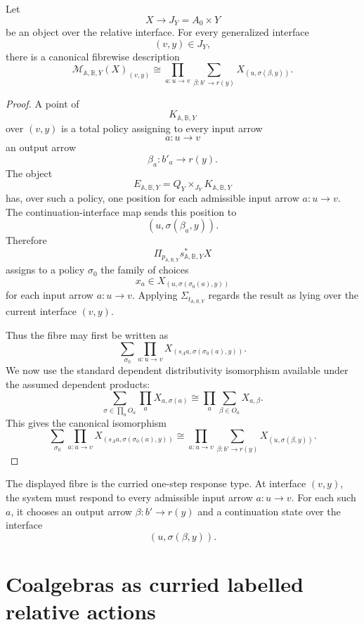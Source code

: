 \begin{proposition}
\label{prop:poly-relative-fibre-calculation}
Let
\[
X\to J_Y=A_0\times Y
\]
be an object over the relative interface.  For every generalized interface
\[
(v,y)\in J_Y,
\]
there is a canonical fibrewise description
\[
\mathcal M_{\mathbb A,\mathbb B,Y}(X)_{(v,y)}
\cong
\prod_{a:u\to v}
\sum_{\beta:b'\to r(y)}
X_{(u,\sigma(\beta,y))}.
\]
\end{proposition}

\begin{proof}
A point of
\[
K_{\mathbb A,\mathbb B,Y}
\]
over \((v,y)\) is a total policy assigning to every input arrow
\[
a:u\to v
\]
an output arrow
\[
\beta_a:b'_a\to r(y).
\]
The object
\[
E_{\mathbb A,\mathbb B,Y}
=
Q_Y\times_{J_Y}K_{\mathbb A,\mathbb B,Y}
\]
has, over such a policy, one position for each admissible input arrow
\(a:u\to v\).  The continuation-interface map sends this position to
\[
(u,\sigma(\beta_a,y)).
\]
Therefore
\[
\Pi_{p_{\mathbb A,\mathbb B,Y}}
s_{\mathbb A,\mathbb B,Y}^{\ast}X
\]
assigns to a policy \(\sigma_0\) the family of choices
\[
x_a\in X_{(u,\sigma(\sigma_0(a),y))}
\]
for each input arrow \(a:u\to v\).  Applying
\(\Sigma_{t_{\mathbb A,\mathbb B,Y}}\) regards the result as lying over the
current interface \((v,y)\).

Thus the fibre may first be written as
\[
\sum_{\sigma_0}
\prod_{a:u\to v}
X_{(s_Aa,\sigma(\sigma_0(a),y))}.
\]
We now use the standard dependent distributivity isomorphism available under
the assumed dependent products:
\[
\sum_{\sigma\in\prod_a O_a}
\prod_a X_{a,\sigma(a)}
\cong
\prod_a
\sum_{\beta\in O_a}X_{a,\beta}.
\]
This gives the canonical isomorphism
\[
\sum_{\sigma_0}
\prod_{a:u\to v}
X_{(s_Aa,\sigma(\sigma_0(a),y))}
\cong
\prod_{a:u\to v}
\sum_{\beta:b'\to r(y)}
X_{(u,\sigma(\beta,y))}.
\]
\end{proof}

\begin{remark}
\label{rem:poly-relative-response-polynomial-meaning}
The displayed fibre is the curried one-step response type.  At interface
\((v,y)\), the system must respond to every admissible input arrow
\(a:u\to v\).  For each such \(a\), it chooses an output arrow
\(\beta:b'\to r(y)\) and a continuation state over the interface
\[
(u,\sigma(\beta,y)).
\]
\end{remark}

\section{Coalgebras as curried labelled relative actions}
\label{sec:poly-relative-coalgebras-labelled-actions}

